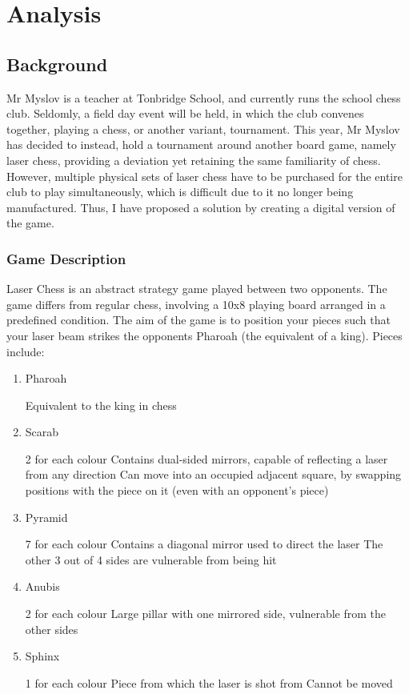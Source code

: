 \documentclass{article}
\begin{document}
\newpage
{}

\section{Analysis}
\subsection{Background}
Mr Myslov is a teacher at Tonbridge School, and currently runs the school chess club. Seldomly, a field day event will be held, in which the club convenes together, playing a chess, or another variant, tournament. This year, Mr Myslov has decided to instead, hold a tournament around another board game, namely laser chess, providing a deviation yet retaining the same familiarity of chess. However, multiple physical sets of laser chess have to be purchased for the entire club to play simultaneously, which is difficult due to it no longer being manufactured. Thus, I have proposed a solution by creating a digital version of the game.

\subsubsection{Game Description}
Laser Chess is an abstract strategy game played between two opponents. The game differs from regular chess, involving a 10x8 playing board arranged in a predefined condition. The aim of the game is to position your pieces such that your laser beam strikes the opponents Pharoah (the equivalent of a king). Pieces include:

\begin{enumerate}
\item Pharoah
    \begin{itemize}[label=(-)]
    Equivalent to the king in chess
    \end{itemize}
\item Scarab
    \begin{itemize}[label=(-)]
    2 for each colour
    Contains dual-sided mirrors, capable of reflecting a laser from any direction
    Can move into an occupied adjacent square, by swapping positions with the piece on it (even with an opponent’s piece)
    \end{itemize}
\item Pyramid
    \begin{itemize}[label=(-)]
    7 for each colour
    Contains a diagonal mirror used to direct the laser
    The other 3 out of 4 sides are vulnerable from being hit
    \end{itemize}
\item Anubis
    \begin{itemize}[label=(-)]
    2 for each colour
    Large pillar with one mirrored side, vulnerable from the other sides
    \end{itemize}
\item Sphinx
    \begin{itemize}[label=(-)]
    1 for each colour
    Piece from which the laser is shot from
    Cannot be moved
    \end{itemize}
\end{enumerate}
\end{document}

